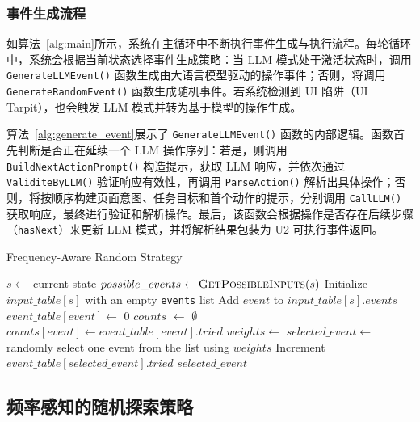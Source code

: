 \documentclass[twocolumn, 10pt]{article}
\begin{document}
\subsubsection{事件生成流程}
\label{sec:generate_event}

如算法~\ref{alg:main}所示，系统在主循环中不断执行事件生成与执行流程。每轮循环中，系统会根据当前状态选择事件生成策略：当 LLM 模式处于激活状态时，调用 \texttt{GenerateLLMEvent()} 函数生成由大语言模型驱动的操作事件；否则，将调用 \texttt{GenerateRandomEvent()} 函数生成随机事件。若系统检测到 UI 陷阱（UI Tarpit），也会触发 LLM 模式并转为基于模型的操作生成。

算法~\ref{alg:generate_event}展示了 \texttt{GenerateLLMEvent()} 函数的内部逻辑。函数首先判断是否正在延续一个 LLM 操作序列：若是，则调用 \texttt{BuildNextActionPrompt()} 构造提示，获取 LLM 响应，并依次通过 \texttt{ValiditeByLLM()} 验证响应有效性，再调用 \texttt{ParseAction()} 解析出具体操作；否则，将按顺序构建页面意图、任务目标和首个动作的提示，分别调用 \texttt{CallLLM()} 获取响应，最终进行验证和解析操作。最后，该函数会根据操作是否存在后续步骤（\texttt{hasNext}）来更新 LLM 模式，并将解析结果包装为 U2 可执行事件返回。

\begin{algorithm}[t]
\caption{Frequency-Aware Random Strategy}
\label{alg:random}
\begin{algorithmic}[1]
\State $s \gets$ current state
    \State $possible\_events \gets \Call{GetPossibleInputs}{s}$
    \State Initialize $input\_table[s]$ with an empty \texttt{events} list
        \State Add $event$ to $input\_table[s].events$
            \State $event\_table[event] \gets$ 0
        \EndIf
    \EndFor
\EndIf
    \State $counts$ $\gets$ $\emptyset$
        \State $counts[event] \gets event\_table[event].tried$
    \EndFor
    \State $weights \gets$ 
    \State $selected\_event \gets$ randomly select one event from the list using $weights$
    \State Increment $event\_table[selected\_event].tried$
    \State \Return $selected\_event$
\EndFunction
\end{algorithmic}
\end{algorithm}

\subsection{频率感知的随机探索策略}
\label{sec:frequency}
\end{document}
